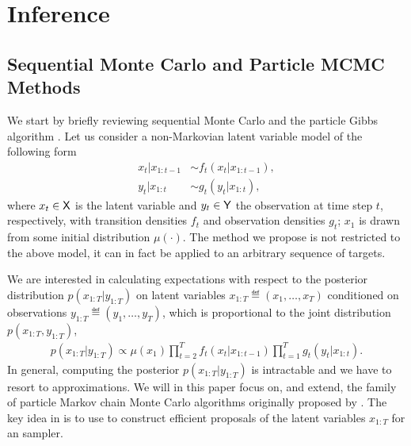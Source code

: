
\chapter{Inference}
\label{sec:inf}

\section{Sequential Monte Carlo and Particle MCMC Methods}
\label{sec:inf:smc}

We start by briefly reviewing sequential Monte Carlo \citep{gordon1993novel,doucet2001sequential} and the particle Gibbs algorithm \citep{andrieuDH2010}. Let us consider a non-Markovian latent variable model of the following form
\begin{subequations}
	\label{eq:ssm}
	\begin{alignat}{2}
		x_t | x_{1:t-1} &\sim f_t(x_t | x_{1:t-1}), \\
		y_t | x_{1:t} &\sim g_t(y_t|x_{1:t}),
	\end{alignat}
\end{subequations}
where $x_t \in \mathsf{X}$ is the latent variable and $y_t \in \mathsf{Y}$ the observation at time step $t$, respectively,
with transition densities $f_t$ and observation densities $g_t$; $x_1$ is drawn from some initial distribution $\mu(\cdot)$. The method we propose is not restricted to the above model, it can in fact be applied to an arbitrary sequence of targets.


We are interested in calculating expectations with respect to the posterior distribution $p(x_{1:T}|y_{1:T})$ on latent variables $x_{1:T} \eqdef (x_1,\ldots,x_T)$ conditioned on observations $y_{1:T} \eqdef (y_1,\ldots,y_T)$, which is proportional to the joint distribution $p(x_{1:T}, y_{1:T})$,
\begin{align}
	\label{eq:jointdistribution}
	p(x_{1:T} | y_{1:T}) \propto  \mu(x_1) \prod_{t=2}^T f_t(x_t | x_{1:t-1}) \prod_{t=1}^T g_t(y_t|x_{1:t}).\nonumber
\end{align}
In general, computing the posterior $p(x_{1:T}|y_{1:T})$ is intractable and we have to resort to approximations. We will in this paper focus on, and extend, the family of particle Markov chain Monte Carlo algorithms originally proposed by \citet{andrieuDH2010}. The key idea in \pmcmc is to use \smc to construct efficient proposals of the latent variables $x_{1:T}$ for an \mcmc sampler.

